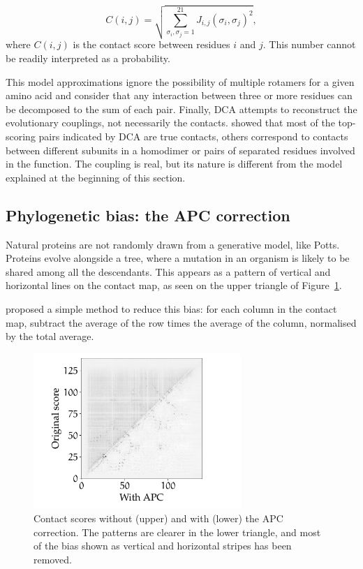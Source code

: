\begin{equation*}
C(i, j) = \sqrt{\sum_{\sigma_i, \sigma_j=1}^{21} J_{i, j}(\sigma_i, \sigma_j)^2},
\end{equation*}
where $C(i, j)$ is the contact score between residues $i$ and $j$.
This number cannot be readily interpreted as a probability.

This model approximations ignore the possibility of multiple rotamers for a given amino acid 
and consider that any interaction between three or more residues can be decomposed to the sum of each pair.
Finally, DCA attempts to reconstruct the evolutionary couplings, not necessarily the contacts.
\citet{contact_errors} showed that most of the top-scoring pairs indicated by DCA are true contacts, others correspond to contacts between different subunits in a homodimer or pairs of separated residues involved in the function.
The coupling is real, but its nature is different from the model explained at the beginning of this section.

\subsection[Phylogenetic bias]{Phylogenetic bias: the APC correction}
Natural proteins are not randomly drawn from a generative model, like Potts.
Proteins evolve alongside a tree, where a mutation in an organism is likely to be shared among all the descendants.
This appears as a pattern of vertical and horizontal lines on the contact map, as seen on the upper triangle of Figure~\ref{fig:apc}.

\citet{apc} proposed a simple method to reduce this bias: for each column in the contact map, subtract the average of the row times the average of the column, normalised by the total average.


\begin{figure}[hbt]
	\centering
	\includegraphics[trim={12mm 3mm 26mm 3mm},clip,width=0.7\textwidth]{bioinfo/figures/apc}
	\caption{Contact scores without (upper) and with (lower) the APC correction.
	The patterns are clearer in the lower triangle, and most of the bias shown as vertical and horizontal stripes has been removed.}\label{fig:apc}
\end{figure}



